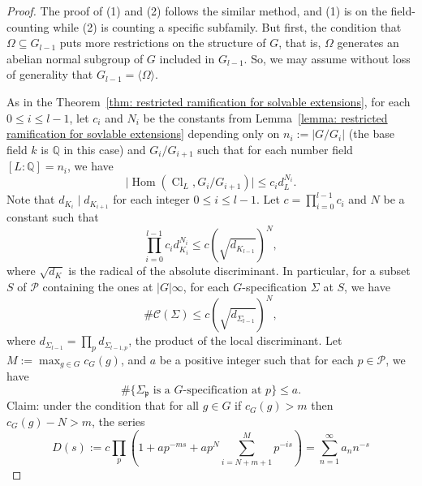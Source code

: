 \documentclass[12pt,a4paper]{amsart}
\numberwithin{equation}{section}%
\theoremstyle{plain}%
\theoremstyle{definition}%
\theoremstyle{remark}%
\begin{document}
    \begin{proof}
    	The proof of (1) and (2) follows the similar method, and (1) is on the field-counting while (2) is counting a specific subfamily.
    	But first, the condition that $\Omega\subseteq G_{l-1}$ puts more restrictions on the structure of $G$, that is, $\Omega$ generates an abelian normal subgroup of $G$ included in $G_{l-1}$.
    	So, we may assume without loss of generality that $G_{l-1}=\langle\Omega\rangle$.
    	
    	As in the Theorem~\ref{thm: restricted ramification for solvable extensions}, for each $0\leq i\leq l-1$, let $c_i$ and $N_i$ be the constants from Lemma~\ref{lemma: restricted ramification for sovlable extensions} depending only on $n_{i}:=\lvert G/G_i\rvert$ (the base field $k$ is $\mathbb{Q}$ in this case) and $G_{i}/G_{i+1}$ such that for each number field $[L:\mathbb{Q}]=n_{i}$, we have
    	\begin{equation*}
    		\lvert\operatorname{Hom}(\operatorname{Cl}_{L},G_{i}/G_{i+1})\rvert\leq c_{i}d_{L}^{N_{i}}.
    	\end{equation*}
    	Note that $d_{K_{i}}\mid d_{K_{i+1}}$ for each integer $0\leq i\leq l-1$.
    	Let $c=\prod_{i=0}^{l-1} c_{i}$ and $N$ be a constant such that
    	\begin{equation}\label{eqn: moment for solvable extensions 1}
    		\prod_{i=0}^{l-1} c_id_{K_i}^{N_i}\leq c(\sqrt{d_{K_{l-1}}})^N,
    	\end{equation}
    	where $\sqrt{d_{K}}$ is the radical of the absolute discriminant.
    	In particular, for a subset $S$ of $\mathcal{P}$ containing the ones at $\lvert G\rvert\infty$, for each $G$-specification $\Sigma$ at $S$, we have
    	\begin{equation*}
    		\#\mathcal{C}(\Sigma)\leq c(\sqrt{d_{\Sigma_{l-1}}})^{N},
    	\end{equation*}
    	where $d_{\Sigma_{l-1}}=\prod_{p}d_{\Sigma_{l-1,p}}$, the product of the local discriminant.
    	Let $M:=\max_{g\in G}c_{G}(g)$, and $a$ be a positive integer such that for each $p\in\mathcal{P}$, we have
    	\begin{equation*}
    		\#\{\Sigma_{\mathfrak{p}}\text{ is a }G\text{-specification at }p\}\leq a.
    	\end{equation*}	
    	Claim: under the condition that for all $g\in G$ if $c_{G}(g)>m$ then $c_{G}(g)-N>m$, the series
    	\begin{equation*}
    		D(s):=c\prod_{p}(1+ap^{-ms}+ap^{N}\sum_{i=N+m+1}^{M}p^{-is})=\sum_{n=1}^{\infty}a_{n}n^{-s}

\end{equation*}
\end{proof}
\end{document}
